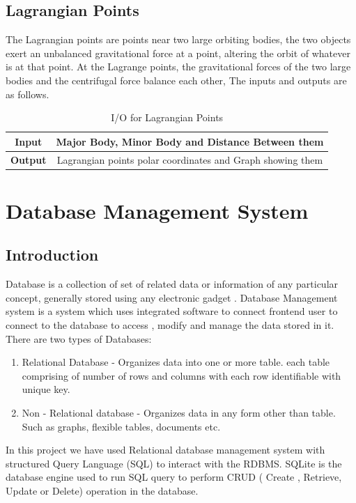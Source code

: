 \documentclass[12pt]{article}
\begin{document}
\subsection{Lagrangian Points}
The Lagrangian points are points near two large orbiting bodies, the two objects exert an unbalanced gravitational force at a point, altering the orbit of whatever is at that point. At the Lagrange points, the gravitational forces of the two large bodies and the centrifugal force balance each other, The inputs and outputs are as follows.
\begin{table}[H]
\begin{tabular}{@{}cc@{}}
\toprule
\textbf{Input}  & Major Body, Minor Body and Distance Between them           \\ \midrule
\textbf{Output} & Lagrangian points polar coordinates and Graph showing them \\ \bottomrule
\end{tabular}\caption{I/O for Lagrangian Points}
\end{table}

\section{Database Management System}
\subsection{Introduction}
Database is a collection of set of related data or information of any particular concept, generally stored using any electronic gadget . Database Management system is a system which uses integrated software to connect frontend user to connect to the database to access , modify and manage the data stored in it.  
There are two types of Databases:
\begin{enumerate}
\item Relational Database - Organizes data into one or more table. each table comprising of number of rows and columns  with each row identifiable with unique key.
\item Non - Relational database - Organizes data in any form other than table. Such as graphs, flexible tables, documents etc.
\end{enumerate}
In this project we have used Relational database management system with structured Query Language (SQL) to interact with the RDBMS. SQLite is the database engine used to run SQL query to perform CRUD ( Create , Retrieve, Update or Delete) operation in the database.
\end{document}
